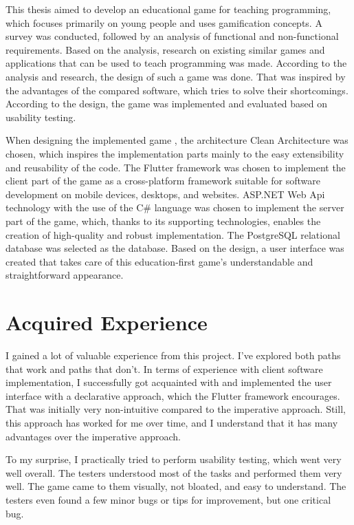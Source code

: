 \begin{conclusion}

This thesis aimed to develop an educational game for teaching programming, which focuses primarily on young people and uses gamification concepts.
A survey was conducted, followed by an analysis of functional and non-functional requirements.
Based on the analysis, research on existing similar games and applications that can be used to teach programming was made.
According to the analysis and research, the design of such a game was done.
That was inspired by the advantages of the compared software, which tries to solve their shortcomings.
According to the design, the game was implemented and evaluated based on usability testing.

When designing the implemented game \myAppName{}, the architecture Clean Architecture was chosen, which inspires the implementation parts mainly to the easy extensibility and reusability of the code.
The Flutter framework was chosen to implement the client part of the game as a cross-platform framework suitable for software development on mobile devices, desktops, and websites.
ASP.NET Web Api technology with the use of the C\# language was chosen to implement the server part of the game, which, thanks to its supporting technologies, enables the creation of high-quality and robust implementation.
The PostgreSQL relational database was selected as the database.
Based on the design, a user interface was created that takes care of this education-first game's understandable and straightforward appearance.

\section{Acquired Experience}

I gained a lot of valuable experience from this project.
I've explored both paths that work and paths that don't.
In terms of experience with client software implementation, I successfully got acquainted with and implemented the user interface with a declarative approach, which the Flutter framework encourages.
That was initially very non-intuitive compared to the imperative approach.
Still, this approach has worked for me over time, and I understand that it has many advantages over the imperative approach.

To my surprise, I practically tried to perform usability testing, which went very well overall.
The testers understood most of the tasks and performed them very well.
The game came to them visually, not bloated, and easy to understand.
The testers even found a few minor bugs or tips for improvement, but one critical bug.


\end{conclusion}

